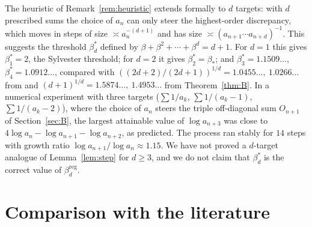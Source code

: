 \documentclass[11pt]{amsart}
\theoremstyle{definition}
\theoremstyle{remark}
\begin{document}
The heuristic of Remark~\ref{rem:heuristic} extends formally to $d$ targets: with $d$
prescribed sums the choice of $a_n$ can only steer the highest-order discrepancy, which
moves in steps of size $\asymp a_n^{-(d+1)}$ and has size $\asymp(a_{n+1}\cdots a_{n+d})^{-1}$.
This suggests the threshold $\beta_d^*$ defined by $\beta+\beta^2+\cdots+\beta^d=d+1$.
For $d=1$ this gives $\beta_1^*=2$, the Sylvester threshold; for $d=2$ it gives
$\beta_2^*=\beta_*$; and $\beta_3^*=1.1509\ldots$, $\beta_4^*=1.0912\ldots$, compared with
$((2d+2)/(2d+1))^{1/d}=1.0455\ldots,\ 1.0266\ldots$ from \cite{KT25} and
$(d+1)^{1/d}=1.5874\ldots,\ 1.4953\ldots$ from Theorem~\ref{thm:B}. In a numerical
experiment with three targets ($\sum1/a_k$, $\sum1/(a_k-1)$, $\sum1/(a_k-2)$), where the
choice of $a_n$ steers the triple off-diagonal sum $O_{n+1}$ of Section~\ref{sec:B}, the
largest attainable value of $\log a_{n+3}$ was close to
$4\log a_n-\log a_{n+1}-\log a_{n+2}$, as predicted. The process ran stably for $14$
steps with growth ratio $\log a_{n+1}/\log a_n\approx1.15$. We have not proved a
$d$-target analogue of Lemma~\ref{lem:step} for $d\ge3$, and we do not claim that
$\beta_d^*$ is the correct value of $\beta_d^{\mathrm{reg}}$.

\section{Comparison with the literature}\label{sec:lit}
\end{document}
